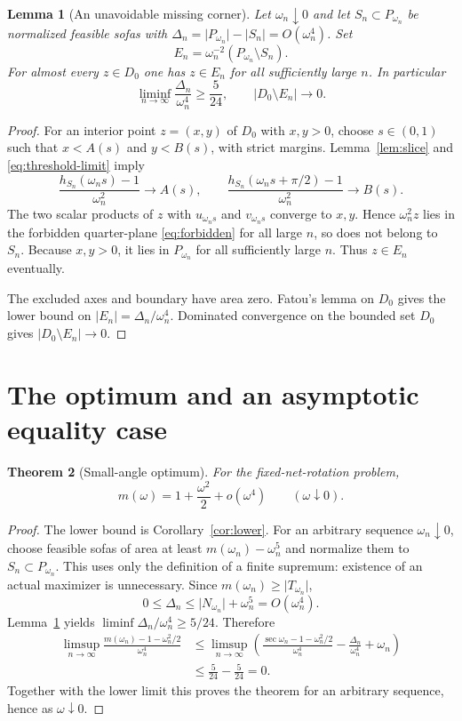 \documentclass[11pt]{article}
\newtheorem{theorem}{Theorem}[section]
\newtheorem{lemma}[theorem]{Lemma}
\theoremstyle{remark}\newtheorem{remark}[theorem]{Remark}
\newcommand{\area}[1]{\lvert #1\rvert}
\begin{document}
\begin{lemma}[An unavoidable missing corner]\label{lem:unavoidable}
Let $\omega_n\downarrow0$ and let $S_n\subset P_{\omega_n}$ be normalized feasible sofas with
$\Delta_n=\area{P_{\omega_n}}-\area{S_n}=O(\omega_n^4)$. Set
\[
 E_n=\omega_n^{-2}(P_{\omega_n}\setminus S_n).
\]
For almost every $z\in D_0$ one has $z\in E_n$ for all sufficiently large $n$. In particular
\[
 \liminf_{n\to\infty}\frac{\Delta_n}{\omega_n^4}\ge\frac5{24},\qquad
 \area{D_0\setminus E_n}\longrightarrow0.
\]
\end{lemma}
\begin{proof}
For an interior point $z=(x,y)$ of $D_0$ with $x,y>0$, choose $s\in(0,1)$ such that $x<A(s)$ and $y<B(s)$, with strict margins. Lemma~\ref{lem:slice} and \eqref{eq:threshold-limit} imply
\[
 \frac{h_{S_n}(\omega_n s)-1}{\omega_n^2}\longrightarrow A(s),\qquad
 \frac{h_{S_n}(\omega_n s+\pi/2)-1}{\omega_n^2}\longrightarrow B(s).
\]
The two scalar products of $z$ with $u_{\omega_n s}$ and $v_{\omega_n s}$ converge to $x,y$. Hence $\omega_n^2z$ lies in the forbidden quarter-plane \eqref{eq:forbidden} for all large $n$, so does not belong to $S_n$. Because $x,y>0$, it lies in $P_{\omega_n}$ for all sufficiently large $n$. Thus $z\in E_n$ eventually.

The excluded axes and boundary have area zero. Fatou's lemma on $D_0$ gives the lower bound on $\area{E_n}=\Delta_n/\omega_n^4$. Dominated convergence on the bounded set $D_0$ gives $\area{D_0\setminus E_n}\to0$.
\end{proof}

\section{The optimum and an asymptotic equality case}
\begin{theorem}[Small-angle optimum]\label{thm:optimum}
For the fixed-net-rotation problem,
\[
 \boxed{\displaystyle m(\omega)=1+\frac{\omega^2}{2}+o(\omega^4)\qquad(\omega\downarrow0).}
\]
\end{theorem}
\begin{proof}
The lower bound is Corollary~\ref{cor:lower}. For an arbitrary sequence $\omega_n\downarrow0$, choose feasible sofas of area at least $m(\omega_n)-\omega_n^5$ and normalize them to $S_n\subset P_{\omega_n}$. This uses only the definition of a finite supremum: existence of an actual maximizer is unnecessary. Since $m(\omega_n)\ge\area{T_{\omega_n}}$,
\[
 0\le\Delta_n\le\area{N_{\omega_n}}+\omega_n^5=O(\omega_n^4).
\]
Lemma~\ref{lem:unavoidable} yields $\liminf\Delta_n/\omega_n^4\ge5/24$. Therefore
\begin{align*}
 \limsup_{n\to\infty}\frac{m(\omega_n)-1-\omega_n^2/2}{\omega_n^4}
 &\le\limsup_{n\to\infty}
 \left(\frac{\sec\omega_n-1-\omega_n^2/2}{\omega_n^4}
       -\frac{\Delta_n}{\omega_n^4}+\omega_n\right)\\
 &\le\frac5{24}-\frac5{24}=0.
\end{align*}
Together with the lower limit this proves the theorem for an arbitrary sequence, hence as $\omega\downarrow0$.
\end{proof}
\end{document}
